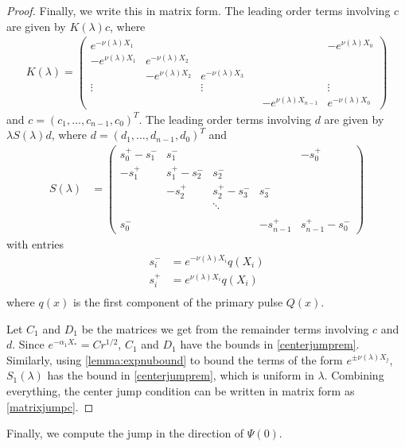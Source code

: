 \documentclass[thesis.tex]{subfiles}
\begin{document}
\begin{lemma}
\begin{proof}
Finally, we write this in matrix form. The leading order terms involving $c$ are given by $K(\lambda)c$, where
\begin{align*}
K(\lambda) =  
\begin{pmatrix}
e^{-\nu(\lambda)X_1} & & & & & -e^{\nu(\lambda)X_0} \\
-e^{\nu(\lambda)X_1} & e^{-\nu(\lambda)X_2} \\
& -e^{\nu(\lambda)X_2} & e^{-\nu(\lambda)X_3} \\
\vdots & & \vdots & &&  \vdots \\
& & & & -e^{\nu(\lambda)X_{n-1}} & e^{-\nu(\lambda)X_0}
\end{pmatrix}
\end{align*}
and $c = (c_1, \dots, c_{n-1}, c_0)^T$. The leading order terms involving $d$ are given by $\lambda S(\lambda) d$, where $d = (d_1, \dots, d_{n-1}, d_0)^T$ and 
\begin{align*}
S(\lambda) &= \begin{pmatrix}
s_0^+ - s_1^- & s_1^- &&& -s_0^+ \\
-s_1^+ & s_1^+ - s_2^- & s_2^- \\
& -s_2^+ & s_2^+ - s_3^- & s_3^- \\ && \ddots \\
\\
s_0^- &&& -s_{n-1}^+ & s_{n-1}^+ - s_0^- 
\end{pmatrix}
\end{align*}
with entries
\begin{align*}
s_i^- &= e^{-\nu(\lambda)X_i} q(X_i)\\
s_i^+ &= e^{\nu(\lambda)X_i} q(X_i)\\
\end{align*}
where $q(x)$ is the first component of the primary pulse $Q(x)$.

Let $C_1$ and $D_1$ be the matrices we get from the remainder terms involving $c$ and $d$. Since $e^{-\alpha_1 X_*} = C r^{1/2}$, $C_1$ and $D_1$ have the bounds in \cref{centerjumprem}. Similarly, using \cref{lemma:expnubound} to bound the terms of the form $e^{\pm \nu(\lambda)X_j}$, $S_1(\lambda)$ has the bound in \cref{centerjumprem}, which is uniform in $\lambda$. Combining everything, the center jump condition can be written in matrix form as \cref{matrixjumpc}.
\end{proof}
\end{lemma}

Finally, we compute the jump in the direction of $\Psi(0)$.
\end{document}
